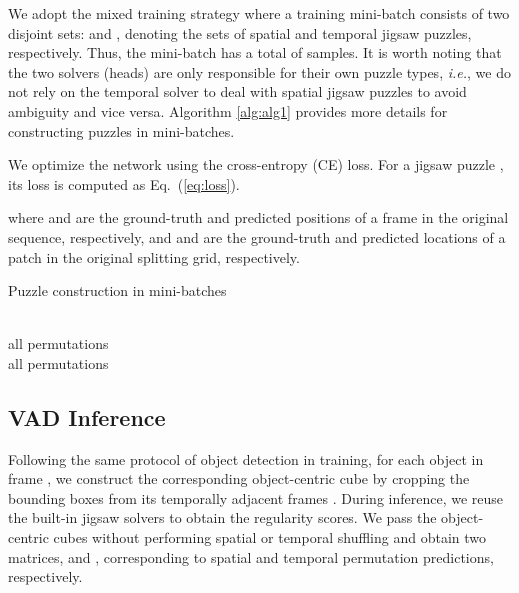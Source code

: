 \documentclass[runningheads]{llncs}
\begin{document}
We adopt the mixed training strategy where a training mini-batch consists of two disjoint sets:  and , denoting the sets of spatial and temporal jigsaw puzzles, respectively. Thus, the mini-batch has a total of  samples. It is worth noting that the two solvers (heads) are only responsible for their own puzzle types, \emph{i.e.}, we do not rely on the temporal solver to deal with spatial jigsaw puzzles to avoid ambiguity and vice versa. Algorithm \ref{alg:alg1} provides more details for constructing puzzles in mini-batches.


We optimize the network using the cross-entropy (CE) loss. For a jigsaw puzzle , its loss is computed as Eq.~(\ref{eq:loss}).

where  and  are the ground-truth and predicted positions of a frame in the original sequence, respectively, and  and  are the ground-truth and predicted locations of a patch in the original splitting grid, respectively.


\begin{algorithm}
\caption{Puzzle construction in mini-batches}
\label{alg:alg1}
\LinesNumbered
\DontPrintSemicolon
{}
\\
 all permutations \\
 all permutations \\
\end{algorithm}


\subsection{VAD Inference}

Following the same protocol of object detection in training, for each object in frame , we construct the corresponding object-centric cube by cropping the bounding boxes from its temporally adjacent frames . During inference, we reuse the built-in jigsaw solvers to obtain the regularity scores. We pass the object-centric cubes without performing spatial or temporal shuffling and obtain two matrices,  and , corresponding to spatial and temporal permutation predictions, respectively.
\end{document}

